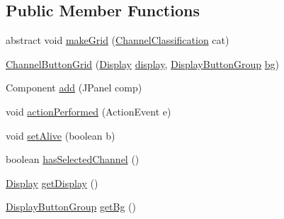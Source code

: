 \subsection*{Public Member Functions}
\begin{DoxyCompactItemize}
\item 
abstract void \hyperlink{classgov_1_1fnal_1_1ppd_1_1dd_1_1changer_1_1ChannelButtonGrid_a5acf39593b87514d5015b219e91ddeac}{make\-Grid} (\hyperlink{classgov_1_1fnal_1_1ppd_1_1dd_1_1changer_1_1ChannelClassification}{Channel\-Classification} cat)
\item 
\hyperlink{classgov_1_1fnal_1_1ppd_1_1dd_1_1changer_1_1ChannelButtonGrid_a71bade30c8299336c618dbc8f32b3a07}{Channel\-Button\-Grid} (\hyperlink{interfacegov_1_1fnal_1_1ppd_1_1dd_1_1signage_1_1Display}{Display} \hyperlink{classgov_1_1fnal_1_1ppd_1_1dd_1_1changer_1_1ChannelButtonGrid_a3c06b51489dcaacd16f6efcefe06bcaa}{display}, \hyperlink{classgov_1_1fnal_1_1ppd_1_1dd_1_1util_1_1specific_1_1DisplayButtonGroup}{Display\-Button\-Group} \hyperlink{classgov_1_1fnal_1_1ppd_1_1dd_1_1changer_1_1ChannelButtonGrid_adf258a89161282e5215b4642ecbec812}{bg})
\item 
Component \hyperlink{classgov_1_1fnal_1_1ppd_1_1dd_1_1changer_1_1ChannelButtonGrid_a456b0016723ac7fec8acaf6f7d6cbabf}{add} (J\-Panel comp)
\item 
void \hyperlink{classgov_1_1fnal_1_1ppd_1_1dd_1_1changer_1_1ChannelButtonGrid_afaef645111328ee05291017d3282201d}{action\-Performed} (Action\-Event e)
\item 
void \hyperlink{classgov_1_1fnal_1_1ppd_1_1dd_1_1changer_1_1ChannelButtonGrid_ae3b31f44dc32cfc243a1f10a3e0040c9}{set\-Alive} (boolean b)
\item 
boolean \hyperlink{classgov_1_1fnal_1_1ppd_1_1dd_1_1changer_1_1ChannelButtonGrid_af108bf6c3ca64c53f11326765fff1611}{has\-Selected\-Channel} ()
\item 
\hyperlink{interfacegov_1_1fnal_1_1ppd_1_1dd_1_1signage_1_1Display}{Display} \hyperlink{classgov_1_1fnal_1_1ppd_1_1dd_1_1changer_1_1ChannelButtonGrid_a08d1ab6630432d9e1817e36a9b6e857a}{get\-Display} ()
\item 
\hyperlink{classgov_1_1fnal_1_1ppd_1_1dd_1_1util_1_1specific_1_1DisplayButtonGroup}{Display\-Button\-Group} \hyperlink{classgov_1_1fnal_1_1ppd_1_1dd_1_1changer_1_1ChannelButtonGrid_a58309efc70714f1b3fc2810823a5df3c}{get\-Bg} ()
\end{DoxyCompactItemize}
